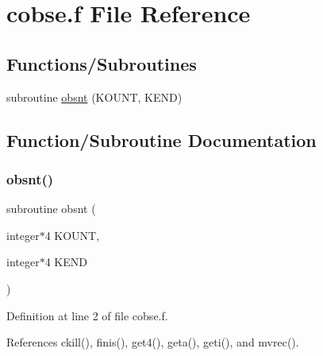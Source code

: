 \hypertarget{cobse_8f}{}\section{cobse.\+f File Reference}
\label{cobse_8f}
\subsection*{Functions/\+Subroutines}
\begin{DoxyCompactItemize}
\item 
subroutine \hyperlink{cobse_8f_a034576bad0d55fc317867ad1a0b6a179}{obsnt} (K\+O\+U\+NT, K\+E\+ND)
\end{DoxyCompactItemize}


\subsection{Function/\+Subroutine Documentation}
\mbox{\label{cobse_8f_a034576bad0d55fc317867ad1a0b6a179}} 
\subsubsection{\texorpdfstring{obsnt()}{obsnt()}}
{\footnotesize\ttfamily subroutine obsnt (\begin{DoxyParamCaption}\item[{integer$\ast$4}]{K\+O\+U\+NT,  }\item[{integer$\ast$4}]{K\+E\+ND }\end{DoxyParamCaption})}



Definition at line 2 of file cobse.\+f.



References ckill(), finis(), get4(), geta(), geti(), and mvrec().

